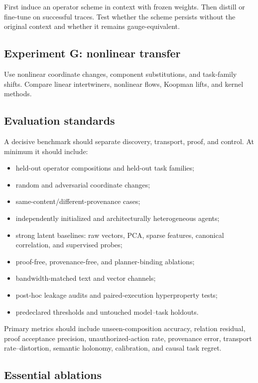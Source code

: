 \documentclass[11pt]{article}
\theoremstyle{definition}
\theoremstyle{remark}
\begin{document}
First induce an operator scheme in context with frozen weights. Then distill or fine-tune on successful traces. Test whether the scheme persists without the original context and whether it remains gauge-equivalent.

\subsection{Experiment G: nonlinear transfer}

Use nonlinear coordinate changes, component substitutions, and task-family shifts. Compare linear intertwiners, nonlinear flows, Koopman lifts, and kernel methods.

\subsection{Evaluation standards}

A decisive benchmark should separate discovery, transport, proof, and control. At minimum it should include:
\begin{itemize}[leftmargin=1.6em]
  \item held-out operator compositions and held-out task families;
  \item random and adversarial coordinate changes;
  \item same-content/different-provenance cases;
  \item independently initialized and architecturally heterogeneous agents;
  \item strong latent baselines: raw vectors, PCA, sparse features, canonical correlation, and supervised probes;
  \item proof-free, provenance-free, and planner-binding ablations;
  \item bandwidth-matched text and vector channels;
  \item post-hoc leakage audits and paired-execution hyperproperty tests;
  \item predeclared thresholds and untouched model--task holdouts.
\end{itemize}

Primary metrics should include unseen-composition accuracy, relation residual, proof acceptance precision, unauthorized-action rate, provenance error, transport rate--distortion, semantic holonomy, calibration, and causal task regret.

\subsection{Essential ablations}
\end{document}
